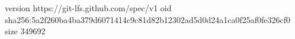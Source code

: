 version https://git-lfs.github.com/spec/v1
oid sha256:5a2f260ba4ba379d6071414c9c81d82b12302ad5d0d24a1ca0f25af0fe326cf0
size 349692
